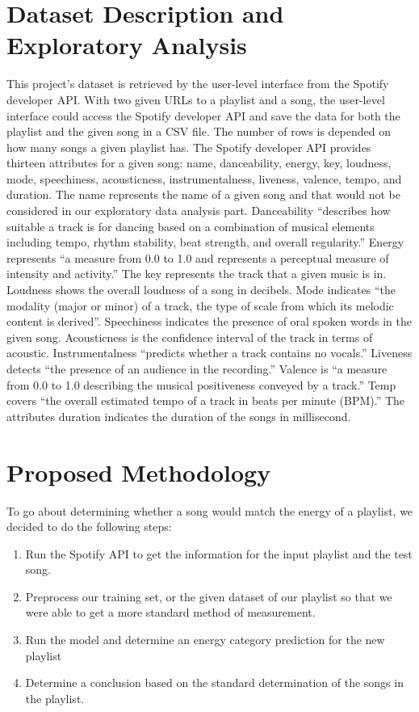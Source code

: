 \documentclass[titlepage]{article}
\begin{document}
\section{Dataset Description and Exploratory Analysis}
This project’s dataset is retrieved by the user-level interface from the Spotify developer API. With two given URLs to a playlist and a song, the user-level interface could access the Spotify developer API and save the data for both the playlist and the given song in a CSV file. The number of rows is depended on how many songs a given playlist has. The Spotify developer API provides thirteen attributes for a given song: name, danceability, energy, key, loudness, mode, speechiness, acousticness, instrumentalness, liveness, valence, tempo, and duration. The name represents the name of a given song and that would not be considered in our exploratory data analysis part. Danceability “describes how suitable a track is for dancing based on a combination of musical elements including tempo, rhythm stability, beat strength, and overall regularity.” Energy represents “a measure from 0.0 to 1.0 and represents a perceptual measure of intensity and activity.” The key represents the track that a given music is in. Loudness shows the overall loudness of a song in decibels.  Mode indicates “the modality (major or minor) of a track, the type of scale from which its melodic content is derived”. Speechiness indicates the presence of oral spoken words in the given song. Acousticness is the confidence interval of the track in terms of acoustic. Instrumentalness “predicts whether a track contains no vocals.” Liveness detects “the presence of an audience in the recording.” Valence is “a measure from 0.0 to 1.0 describing the musical positiveness conveyed by a track.” Temp covers “the overall estimated tempo of a track in beats per minute (BPM).” The attributes duration indicates the duration of the songs in millisecond. 


\section{Proposed Methodology}
To go about determining whether a song would match the energy of a playlist, we decided to do the following steps:
\begin{enumerate}
    \item Run the Spotify API to get the information for the input playlist and the test song.
    \item Preprocess our training set, or the given dataset of our playlist so that we were able to get a more standard method of measurement.
    \item Run the model and determine an energy category prediction for the new playlist
    \item Determine a conclusion based on the standard determination of the songs in the playlist.
\end{enumerate} 
\end{document}
